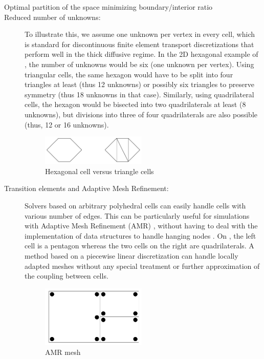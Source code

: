 \begin{description}
  \item[Optimal partition of the space minimizing boundary/interior ratio]
  \item[Reduced number of unknowns:] To illustrate this, we assume
    one unknown per vertex in every cell, which is standard for discontinuous
    finite element transport discretizations that perform well in the thick
    diffusive regime. In the 2D hexagonal example of ,
    the number of unknowns would be six (one unknown per vertex). Using
    triangular cells, the same hexagon would have to be split into four
    triangles at least (thus 12 unknowns) or possibly six triangles to
    preserve symmetry (thus 18 unknowns in that case). Similarly, using
    quadrilateral cells, the hexagon would be bisected into two quadrilaterals
    at least (8 unknowns), but divisions into three of four quadrilaterals are
    also possible (thus, 12 or 16 unknowns).
    \begin{figure}[H]
      \centering
      \includegraphics[width=5cm]{hex_tri_cells}
      \caption{Hexagonal cell versus triangle cells}
      \label{fig_hex_vs_tri}
    \end{figure}
  \item[Transition elements and Adaptive Mesh Refinement:] Solvers based on
    arbitrary polyhedral cells can easily handle cells with various number of
    edges. This can be particularly useful for simulations
    with Adaptive Mesh Refinement (AMR) \cite{Jessee1998,Baker2002,Wang2010a}, 
    without having to deal with the implementation of data structures to handle 
    hanging nodes \cite{Solin2008,Bangerth2007,Arnold2000}. On , 
    the left cell is a pentagon whereas the two cells on the right are 
    quadrilaterals. A method based on a piecewise linear discretization can
    handle locally adapted meshes without any special treatment or further
    approximation of the coupling between cells.
    \begin{figure}[H]
      \centering
      \includegraphics[width=5cm]{amr}
      \caption{AMR mesh}
      \label{fig_amr_cells}
    \end{figure}
\end{description}
